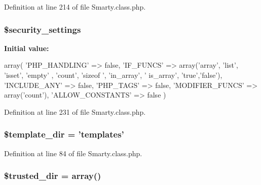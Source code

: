 \-Definition at line 214 of file \-Smarty.\-class.\-php.

\hypertarget{class_smarty_a905ec38d7cf957e041a8ed941320e5af}{
\subsubsection[{\$security\-\_\-settings}]{\setlength{\rightskip}{0pt plus 5cm}\$security\-\_\-settings}}\label{class_smarty_a905ec38d7cf957e041a8ed941320e5af}
{\bfseries \-Initial value\-:}
\begin{DoxyCode}
 array(
                                    'PHP_HANDLING'    => false,
                                    'IF_FUNCS'        => array('array', 'list',
                                                               'isset', 'empty'
      ,
                                                               'count', 'sizeof
      ',
                                                               'in_array', '
      is_array',
                                                               'true','false'),
                                    'INCLUDE_ANY'     => false,
                                    'PHP_TAGS'        => false,
                                    'MODIFIER_FUNCS'  => array('count'),
                                    'ALLOW_CONSTANTS' => false
                                   )
\end{DoxyCode}


\-Definition at line 231 of file \-Smarty.\-class.\-php.

\hypertarget{class_smarty_a9677af6792fd68e3968c8b7ff44f2b36}{
\subsubsection[{\$template\-\_\-dir}]{\setlength{\rightskip}{0pt plus 5cm}\$template\-\_\-dir = 'templates'}}\label{class_smarty_a9677af6792fd68e3968c8b7ff44f2b36}


\-Definition at line 84 of file \-Smarty.\-class.\-php.

\hypertarget{class_smarty_a4541edfa0e2dd6b0e4b1da10c14fa52c}{
\subsubsection[{\$trusted\-\_\-dir}]{\setlength{\rightskip}{0pt plus 5cm}\$trusted\-\_\-dir = array()}}\label{class_smarty_a4541edfa0e2dd6b0e4b1da10c14fa52c}


